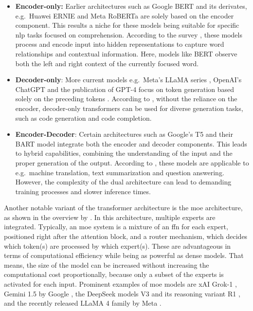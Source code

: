 \begin{itemize}
   \item \textbf{Encoder-only:} Earlier architectures such as Google BERT \cite{devlin_bert_2019} and its derivates, e.g.\ Huawei ERNIE \cite{zhang_ernie_2019} and Meta RoBERTa \cite{liu_roberta_2019} are solely based on the encoder component. This results a niche for these models being suitable for specific \ac{nlp} tasks focused on comprehension. According to the survey \cite{hou_large_2024}, these models process and encode input into hidden representations to capture word relationships and contextual information. Here, models like BERT observe both the left and right context of the currently focused word.
   
   \item \textbf{Decoder-only}:
   More current models e.g.\ Meta's LLaMA series \cite{touvron_llama_2023}, OpenAI's ChatGPT \cite{openai_introducing_2022} and the publication of GPT-4 \cite{openai_gpt-4_2024} focus on token generation based solely on the preceding tokens \cite{shao_survey_2024}. According to \cite{hou_large_2024}, without the reliance on the encoder, decoder-only transformers can be used for diverse generation tasks, such as code generation and code completion.

   \item \textbf{Encoder-Decoder}: Certain architectures such as Google's T5 \cite{raffel_exploring_2023} and their BART model \cite{lewis_bart_2019} integrate both the encoder and decoder components. This leads to hybrid capabilities, combining the understanding of the input and the proper generation of the output. According to \cite{wang_history_2024}, these models are applicable to e.g.\ machine translation, text summarization and question answering. However, the complexity of the dual architecture can lead to demanding training processes and slower inference times.
\end{itemize}

 Another notable variant of the transformer architecture is the \ac{moe} \cite{shazeer_outrageously_2017} architecture, as shown in the overview by \cite{naveed_comprehensive_2024}. In this architecture, multiple experts are integrated. Typically, an \ac{moe} system is a mixture of an \ac{ffn} for each expert, positioned right after the attention block, and a router mechanism, which decides which token(s) are processed by which expert(s). These are advantageous in terms of computational efficiency while being as powerful as dense models. That means, the size of the model can be increased without increasing the computational cost proportionally, because only a subset of the experts is activated for each input. %
Prominent examples of \ac{moe} models are xAI Grok-1 \cite{xai_open_2024}, Gemini 1.5 by Google \cite{team_gemini_2024-1}, the DeepSeek models V3 \cite{deepseek-ai_deepseek-v3_2025} and its reasoning variant R1 \cite{deepseek-ai_deepseek-r1_2025}, and the recently released LLaMA 4 family by Meta \cite{meta_ai_llama_2025}.

